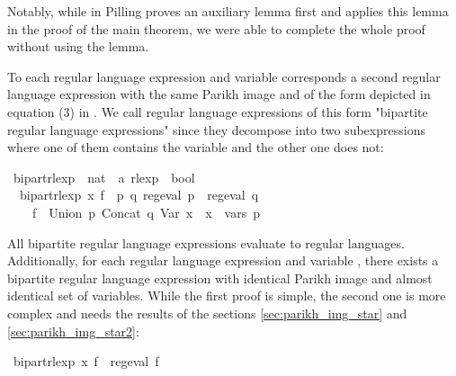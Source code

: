 \begin{isabellebody}
\begin{isamarkuptext}
Notably, while in \cite{Pilling} Pilling proves an auxiliary lemma first and applies this lemma in
the proof of the main theorem, we were able to complete the whole proof without using the lemma.%
\end{isamarkuptext}\isamarkuptrue%
%
\isadelimdocument
%
\endisadelimdocument
%
\isatagdocument
%
\isamarkuptrue%
%
\endisatagdocument
{\isafolddocument}%
%
\isadelimdocument
%
\endisadelimdocument
%
\begin{isamarkuptext}%
To each  regular language expression and variable  corresponds a second
regular language expression with the same Parikh image and of the form depicted in equation (3) in
\cite{Pilling}. We call regular language expressions of this form "bipartite regular language
expressions" since they decompose into two subexpressions where one of them contains the variable
 and the other one does not:%
\end{isamarkuptext}\isamarkuptrue%
\isamarkupfalse%
\ bipart{\isacharunderscore}{\kern0pt}rlexp\ {\isacharcolon}{\kern0pt}{\isacharcolon}{\kern0pt}\ {\isachardoublequoteopen}nat\ {\isasymRightarrow}\ {\isacharprime}{\kern0pt}a\ rlexp\ {\isasymRightarrow}\ bool{\isachardoublequoteclose}\ \isanewline
\ \ {\isachardoublequoteopen}bipart{\isacharunderscore}{\kern0pt}rlexp\ x\ f\ {\isasymequiv}\ {\isasymexists}p\ q{\isachardot}{\kern0pt}\ reg{\isacharunderscore}{\kern0pt}eval\ p\ {\isasymand}\ reg{\isacharunderscore}{\kern0pt}eval\ q\ {\isasymand}\isanewline
\ \ \ \ f\ {\isacharequal}{\kern0pt}\ Union\ p\ {\isacharparenleft}{\kern0pt}Concat\ q\ {\isacharparenleft}{\kern0pt}Var\ x{\isacharparenright}{\kern0pt}{\isacharparenright}{\kern0pt}\ {\isasymand}\ x\ {\isasymnotin}\ vars\ p{\isachardoublequoteclose}%
\begin{isamarkuptext}%
All bipartite regular language expressions evaluate to regular languages. Additionally,
for each  regular language expression and variable , there exists a bipartite
regular language expression with identical Parikh image and almost identical set of variables.
While the first proof is simple, the second one is more complex and needs the results of the
sections \ref{sec:parikh_img_star} and \ref{sec:parikh_img_star2}:%
\end{isamarkuptext}\isamarkuptrue%
\isamarkupfalse%
\ {\isachardoublequoteopen}bipart{\isacharunderscore}{\kern0pt}rlexp\ x\ f\ {\isasymLongrightarrow}\ reg{\isacharunderscore}{\kern0pt}eval\ f{\isachardoublequoteclose}\isanewline

\end{isabellebody}
